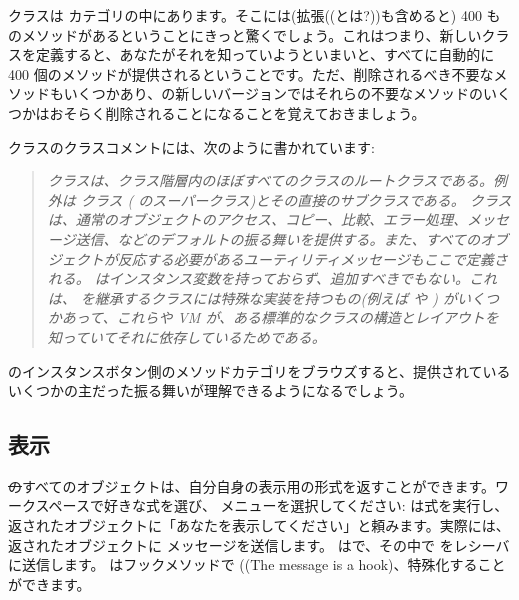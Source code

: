 \documentclass[a4paper,10pt,twoside]{book}
\begin{document}
 クラスは  カテゴリの中にあります。そこには(拡張((とは?))も含めると) 400 ものメソッドがあるということにきっと驚くでしょう。これはつまり、新しいクラスを定義すると、あなたがそれを知っていようといまいと、すべてに自動的に 400 個のメソッドが提供されるということです。ただ、削除されるべき不要なメソッドもいくつかあり、\pharo の新しいバージョンではそれらの不要なメソッドのいくつかはおそらく削除されることになることを覚えておきましょう。

 クラスのクラスコメントには、次のように書かれています:

\begin{quote}
\textit{ クラスは、クラス階層内のほぼすべてのクラスのルートクラスである。例外は  クラス ( のスーパークラス)とその直接のサブクラスである。
 クラスは、通常のオブジェクトのアクセス、コピー、比較、エラー処理、メッセージ送信、などのデフォルトの振る舞いを提供する。また、すべてのオブジェクトが反応する必要があるユーティリティメッセージもここで定義される。
 はインスタンス変数を持っておらず、追加すべきでもない。これは、 を継承するクラスには特殊な実装を持つもの(例えば  や ) がいくつかあって、これらや VM が、ある標準的なクラスの構造とレイアウトを知っていてそれに依存しているためである。}
\end{quote}

 のインスタンスボタン側のメソッドカテゴリをブラウズすると、提供されているいくつかの主だった振る舞いが理解できるようになるでしょう。

\subsection{表示}
\st のすべてのオブジェクトは、自分自身の表示用の形式を返すことができます。ワークスペースで好きな式を選び、 メニューを選択してください:  は式を実行し、返されたオブジェクトに「あなたを表示してください」と頼みます。実際には、返されたオブジェクトに  メッセージを送信します。 はで、その中で  をレシーバに送信します。 はフックメソッドで ((The message  is a hook)、特殊化することができます。
\end{document}
